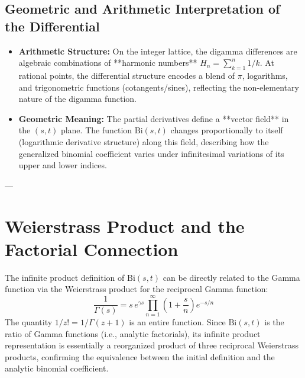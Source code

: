 \documentclass{article}
\newcommand{\Bi}{\mathrm{Bi}}
\newcommand{\eulergam}{\gamma} %
\begin{document}
\subsection{Geometric and Arithmetic Interpretation of the Differential}
\begin{itemize}
    \item \textbf{Arithmetic Structure:} On the integer lattice, the digamma differences are algebraic combinations of **harmonic numbers** $H_n = \sum_{k=1}^n 1/k$. At rational points, the differential structure encodes a blend of $\pi$, logarithms, and trigonometric functions (cotangents/sines), reflecting the non-elementary nature of the digamma function.
    \item \textbf{Geometric Meaning:} The partial derivatives define a **vector field** in the $(s,t)$ plane. The function $\Bi(s,t)$ changes proportionally to itself (logarithmic derivative structure) along this field, describing how the generalized binomial coefficient varies under infinitesimal variations of its upper and lower indices.
\end{itemize}

---

\section{Weierstrass Product and the Factorial Connection}

The infinite product definition of $\Bi(s,t)$ can be directly related to the Gamma function via the Weierstrass product for the reciprocal Gamma function:
$$
\frac{1}{\Gamma(s)} = s\, e^{\eulergam s} \prod_{n=1}^\infty \left(1 + \frac{s}{n}\right) e^{-s/n}
$$
The quantity $1/z! = 1/\Gamma(z+1)$ is an entire function. Since $\Bi(s,t)$ is the ratio of Gamma functions (i.e., analytic factorials), its infinite product representation is essentially a reorganized product of three reciprocal Weierstrass products, confirming the equivalence between the initial definition and the analytic binomial coefficient.
\end{document}
